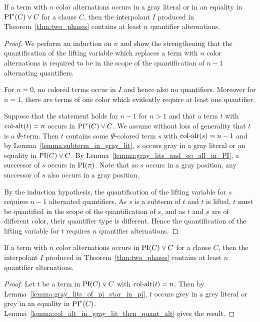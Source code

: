 \documentclass[%
	draft=false,%
	numbers=noendperiod,%
	11pt,%
	a4paper,%
	oneside,%
	openany,%
]{memoir}
\begin{document}
\begin{lemma}
	\label{lemma:col_alt_in_gray_lit_then_quant_alt}
	If a term with $n$ color alternations occurs in a gray literal or in an equality in $\operatorname{PI}^*(C) \lor C$ for a clause $C$, then the interpolant $I$ produced in Theorem~\ref{thm:two_phases} contains at least $n$ quantifier alternations.
\end{lemma}
\begin{proof}
	We perform an induction on $n$
	and show the strengthening that
	the quantification of the lifting variable which replaces a term with $n$ color alternations is required to be in the scope of the quantification of $n-1$ alternating quantifiers.

	For $n=0$, no colored terms occur in $I$ and hence also no quantifiers.
	Moreover for $n=1$, there are terms of one color which evidently require at least one quantifier.

	Suppose that the statement holds for $n-1$ for $n>1$ and that a term $t$ with $\operatorname{col-alt}(t) = n$ occurs in $\operatorname{PI}^*(C) \lor C$.
	We assume without loss of generality that $t$ is a $\Phi$-term.
	Then $t$ contains some $\Psi$-colored term $s$ with $\operatorname{col-alt}(s) = n-1$ and
	by Lemma~\ref{lemma:subterm_in_gray_lit}, $s$ occurs gray in a gray literal or an equality in $\operatorname{PI}(C) \lor C$.
	By Lemma~\ref{lemma:gray_lits_and_eq_all_in_PI}, a successor of $s$ occurs in $\operatorname{PI}(\pi)$. Note that as $s$ occurs in a gray position, any successor of $s$ also occurs in a gray position.

	By the induction hypothesis, the quantification of the lifting variable for $s$ requires $n-1$ alternated quantifiers.
	As $s$ is a subterm of $t$ and $t$ is lifted, $t$ must be quantified in the scope of the quantification of $s$, and as $t$ and $s$ are of different color, their quantifier type is different. 
	Hence the quantification of the lifting variable for $t$ requires $n$ quantifier alternations.
\end{proof}

\begin{lemma}
	\label{lemma:quant_alt_lower_bound}
	If a term with $n$ color alternations occurs in $\operatorname{PI}(C) \lor C$ for a clause $C$, then the interpolant $I$ produced in Theorem~\ref{thm:two_phases} contains at least $n$ quantifier alternations.
\end{lemma}
\begin{proof}
	Let $t$ be a term in $\operatorname{PI}(C) \lor C$ with $\operatorname{col-alt}(t) = n$.
	Then by Lemma~\ref{lemma:gray_lits_of_pi_star_in_pi}, $t$ occurs grey in a grey literal or grey in an equality in $\operatorname{PI}^*(C)$.
	Lemma~\ref{lemma:col_alt_in_gray_lit_then_quant_alt} gives the result.
\end{proof}
\end{document}
